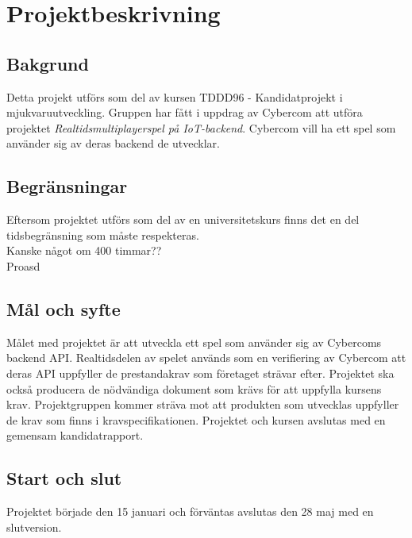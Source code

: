 \section{Projektbeskrivning}

\subsection{Bakgrund}
Detta projekt utförs som del av kursen TDDD96 - Kandidatprojekt i \\mjukvaruutveckling. Gruppen har fått i uppdrag av Cybercom att utföra projektet \textit{Realtidsmultiplayerspel på IoT-backend}. Cybercom vill ha ett spel som använder sig av deras backend de utvecklar.

\subsection{Begränsningar}
Eftersom projektet utförs som del av en universitetskurs finns det en del tidsbegränsning som måste respekteras.\\Kanske något om 400 timmar??\\
Proasd

\subsection{Mål och syfte}
Målet med projektet är att utveckla ett spel som använder sig av Cybercoms backend API. Realtidsdelen av spelet används som en verifiering av Cybercom att deras API uppfyller de prestandakrav som företaget strävar efter. Projektet ska också producera de nödvändiga dokument som krävs för att uppfylla kursens krav. Projektgruppen kommer sträva mot att produkten som utvecklas uppfyller de krav som finns i kravspecifikationen. Projektet och kursen avslutas med en gemensam kandidatrapport.



\subsection{Start och slut}
Projektet började den 15 januari och förväntas avslutas den 28 maj med en slutversion.

